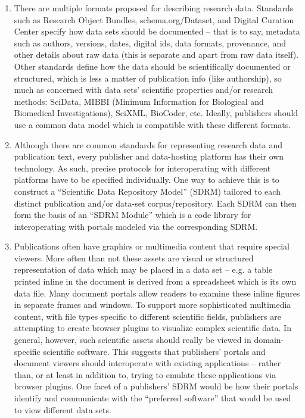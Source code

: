 \documentclass[11pt,letterpaper]{article}
\newcommand{\q}[1]{{\fontfamily{qcr}\selectfont ``}#1{\fontfamily{qcr}\selectfont ''}}
\begin{document}
{{\begin{enumerate}  
\item{} There are multiple formats proposed for describing research data.  Standards such as Research Object Bundles, schema.org/Dataset, and Digital Curation Center specify how data sets should be documented -- that is to say, metadata such as authors, versions, dates, digital ids, data formats, provenance, and other details about raw data (this is separate and apart from raw data itself).  Other standards define how the data should be scientifically documented or structured, which is less a matter of publication info (like authorship), so much as concerned with data sets' scientific properties and/or research methods: SciData, MIBBI (Minimum Information for Biological and Biomedical Investigations), SciXML, BioCoder, etc.  Ideally, publishers should use a common data model which is compatible with these different formats.

\item{}  Although there are common standards for representing research data and publication text, every publisher and data-hosting platform has their own technology.  As such, precise protocols for interoperating with different platforms have to be specified individually.  One way to achieve this is to construct a \q{Scientific Data Repository Model} (SDRM) tailored to each distinct publication and/or data-set corpus/repository.  Each SDRM can then form the basis of an \q{SDRM Module} which is a code library for interoperating with portals modeled via the corresponding SDRM.

\item{} Publications often have graphics or multimedia content that require special viewers.  More often than not these assets are visual or structured representation of data which may be placed in a data set -- e.g. a table printed inline in the document is derived from a spreadsheet which is its own data file.  Many document portals allow readers to examine these inline figures in separate frames and windows.  To support more sophisticated multimedia content, with file types specific to different scientific fields, publishers are attempting to create browser plugins to visualize complex scientific data.  In general, however, such scientific assets should really be viewed in domain-specific scientific software.  This suggests that publishers' portals and document viewers should interoperate with existing applications -- rather than, or at least in addition to, trying to emulate these applications via browser plugins.  One facet of a publishers' SDRM would be how their portals identify and communicate with the \q{preferred software} that would be used to view different data sets.


\end{enumerate}}}
\end{document}

